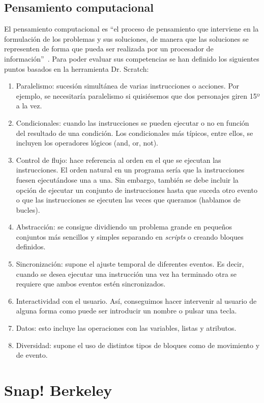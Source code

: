 \documentclass[a4paper, 12pt]{book}
\begin{document}
\subsection{Pensamiento computacional}
El pensamiento computacional es ``el proceso de pensamiento que interviene en la formulación de los problemas y sus soluciones, de manera que las soluciones se representen de forma que pueda ser realizada por un procesador de información''~\cite{wing2011research}. Para poder evaluar sus competencias se han definido los siguientes puntos basados en la herramienta Dr. Scratch:
\begin{enumerate}[1)]
    \item Paralelismo: sucesión simultánea de varias instrucciones o acciones. Por ejemplo, se necesitaría paralelismo si quisiésemos que dos personajes giren 15º a la vez.
    \item Condicionales: cuando las instrucciones se pueden ejecutar o no en función del resultado de una condición. Los condicionales más típicos, entre ellos, se incluyen los operadores lógicos (and, or, not).
    \item Control de flujo: hace referencia al orden en el que se ejecutan las instrucciones. El orden natural en un programa sería que la instrucciones fuesen ejecutándose una a una. Sin embargo, también se debe incluir la opción de ejecutar un conjunto de instrucciones hasta que suceda otro evento o que las instrucciones se ejecuten las veces que queramos (hablamos de bucles).
    \item Abstracción: se consigue dividiendo un problema grande en pequeños conjuntos más sencillos y simples separando en \emph{scripts} o creando bloques definidos.
    \item Sincronización: supone el ajuste temporal de diferentes eventos. Es decir, cuando se desea ejecutar una instrucción una vez ha terminado otra se requiere que ambos eventos estén sincronizados.
    \item Interactividad con el usuario. Así, conseguimos hacer intervenir al usuario de alguna forma como puede ser introducir un nombre o pulsar una tecla.
    \item Datos: esto incluye las operaciones con las variables, listas y atributos.
    \item Diversidad: supone el uso de distintos tipos de bloques como de movimiento y de evento.
\end{enumerate}

\section{Snap! Berkeley}
\end{document}
